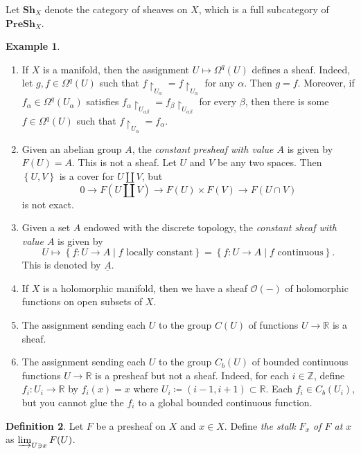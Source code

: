 \documentclass[10pt,letterpaper,cm]{nupset}
\theoremstyle{definition}
\newtheorem{definition}{Definition}[subsection]
\newtheorem{exmp}[definition]{Example}
\theoremstyle{theorem}
\theoremstyle{remark}
\newcommand{\R}{\mathbb{R}}
\newcommand{\Z}{\mathbb Z}
\newcommand{\1}{\mathbb{1}}
\newcommand{\0}{\vec 0}
\begin{document}
Let $\mathbf{Sh}_{X}$ denote the category of sheaves on $X$, which is a full subcategory of $\mathbf{PreSh}_X$.

\begin{exmp} $ $
\begin{enumerate}
\item If $X$ is a manifold, then the assignment $U \mapsto \Omega^q(U)$ defines a sheaf. Indeed, let $g,f \in \Omega^q(U)$ such that $f \restriction_{U_{\alpha}} = f \restriction_{U_{\alpha}}$ for any $\alpha$. Then $g=f$. Moreover, if $f_{\alpha}\in \Omega^q(U_{\alpha})$ satisfies $f_{\alpha}\restriction_{U_{\alpha \beta}} = f_{\beta} \restriction_{U_{\alpha \beta}}$ for every $\beta$, then there is some $f \in \Omega^q(U)$ such that $f \restriction_{U_{\alpha}} = f_{\alpha}$.
\item Given an  abelian group $A$, the \textit{constant presheaf with value $A$} is given by $F(U) = A$. This is not a sheaf. Let $U$ and $V$ be any two spaces. Then $\left\{U, V\right\}$ is a cover for $U \coprod V$, but $$0 \to F\left(U \coprod V\right) \to F(U) \times F(V) \to F\left(U \cap V\right)$$ is not exact.
\item Given a set $A$ endowed with the discrete topology, the \textit{constant sheaf with value $A$}  is given by $$U \mapsto \left\{ f : U \to A \mid f \text{ locally constant}\right\} =   \left\{ f : U \to A \mid f \text{ continuous}\right\}.$$ This is denoted by  $\underline{A}$.
\item If $X$ is a holomorphic manifold, then we have a sheaf $\mathcal{O}({-})$ of holomorphic functions on open subsets of $X$.
\item The assignment sending each $U$ to the group $C(U)$ of functions $U \to \R$ is a sheaf.
\item  The assignment sending each $U$ to the group $C_b(U)$ of bounded continuous functions $U \to \R$ is a presheaf but not a sheaf. Indeed, for each $i\in \Z$, define $f_i : U_i \to \R$ by $f_i(x) = x$ where $U_i \coloneqq \left(i-1, i+1\right)\subset \R$. Each $f_i \in C_b(U_i)$, but you cannot glue the $f_i$ to a global bounded continuous function.  
\end{enumerate}
\end{exmp}

\begin{definition} 
Let $F$ be a presheaf on $X$ and $x\in X$. Define \textit{the stalk $F_x$ of $F$ at $x$} as $\varinjlim_{U \ni x}F(U)$.
\end{definition}
\end{document}
